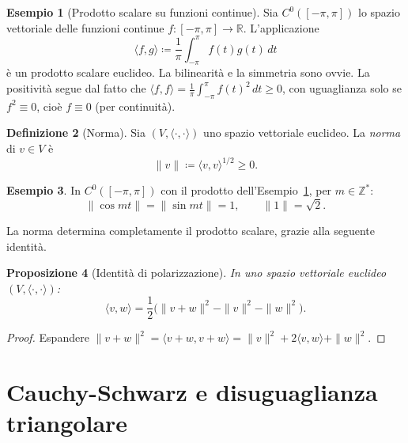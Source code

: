 \documentclass[11pt, a4paper]{book}
\theoremstyle{definition}
\newtheorem{definizione}{Definizione}[section]
\newtheorem{esempio}[definizione]{Esempio}
\theoremstyle{plain}
\newtheorem{proposizione}[definizione]{Proposizione}
\theoremstyle{remark}
\newcommand{\Z}{\mathbb{Z}}
\newcommand{\R}{\mathbb{R}}
\begin{document}
\begin{exbox}
\begin{esempio}[Prodotto scalare su funzioni continue]
\label{es:prodotto-funzioni}
Sia $C^0([-\pi,\pi])$ lo spazio vettoriale delle funzioni continue $f \colon [-\pi,\pi] \to \R$. L'applicazione
\[
  \langle f,g\rangle \coloneqq \frac{1}{\pi}\int_{-\pi}^{\pi} f(t)g(t)\,dt
\]
è un prodotto scalare euclideo. La bilinearità e la simmetria sono ovvie. La positività segue dal fatto che $\langle f,f\rangle = \frac{1}{\pi}\int_{-\pi}^\pi f(t)^2\,dt \geq 0$, con uguaglianza solo se $f^2 \equiv 0$, cioè $f \equiv 0$ (per continuità).
\end{esempio}
\end{exbox}

\begin{defbox}
\begin{definizione}[Norma]
Sia $(V,\langle\cdot,\cdot\rangle)$ uno spazio vettoriale euclideo. La \emph{norma} di $v \in V$ è
\[
  \|v\| \coloneqq \langle v,v\rangle^{1/2} \geq 0.
\]
\end{definizione}
\end{defbox}

\begin{exbox}
\begin{esempio}
In $C^0([-\pi,\pi])$ con il prodotto dell'Esempio~\ref{es:prodotto-funzioni}, per $m \in \Z^*$:
\[
  \|\cos mt\| = \|\sin mt\| = 1, \qquad \|1\| = \sqrt{2}.
\]
\end{esempio}
\end{exbox}

La norma determina completamente il prodotto scalare, grazie alla seguente identità.

\begin{proposizione}[Identità di polarizzazione]
\label{prop:polarizzazione}
In uno spazio vettoriale euclideo $(V,\langle\cdot,\cdot\rangle)$:
\[
  \langle v,w\rangle = \frac{1}{2}\bigl(\|v+w\|^2 - \|v\|^2 - \|w\|^2\bigr).
\]
\end{proposizione}

\begin{proof}
Espandere $\|v+w\|^2 = \langle v+w,v+w\rangle = \|v\|^2 + 2\langle v,w\rangle + \|w\|^2$.
\end{proof}

\section{Cauchy-Schwarz e disuguaglianza triangolare}
\label{sec:cauchy-schwarz}
\end{document}
